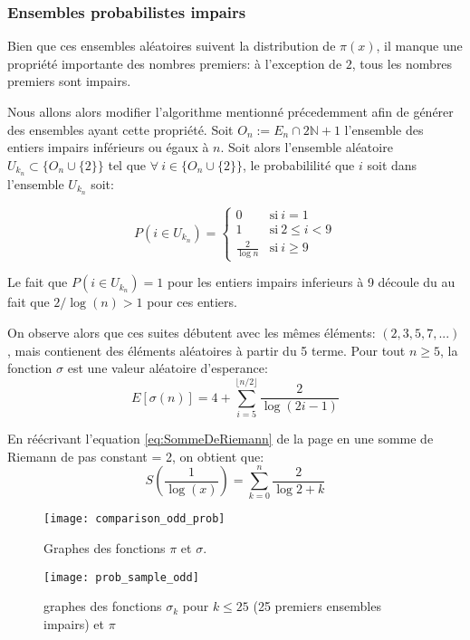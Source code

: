 \documentclass[../main.tex]{report}
\begin{document}
    \label{sec:odd_prob}
\subsubsection{Ensembles probabilistes impairs}
Bien que ces ensembles aléatoires suivent la distribution de $\pi(x)$, il manque une propriété importante des nombres premiers: à l'exception de $2$, tous les nombres premiers sont impairs.

Nous allons alors modifier l'algorithme mentionné précedemment afin de générer des ensembles ayant cette propriété. 
Soit $O_n := E_n \cap 2 \mathbb{N} +1$ l'ensemble des entiers impairs inférieurs ou égaux à $n$. 
Soit alors l'ensemble aléatoire 
$U_{k_n} \subset \{O_n \cup \{2\}\}$
tel que $\forall~i \in \{O_n \cup \{2\}\}$, le probabililité que $i$ soit dans l'ensemble $U_{k_n}$ soit:

\[
P(i \in U_{k_n}) = 
\left\{ 
    \begin{array}{cl}
         0 & \mbox{si}~i = 1 \\
         1 & \mbox{si}~ 2 \leq i < 9 \\
         \frac{2}{\log n} & \mbox{si}~i \geq 9
    \end{array}
\right.
\]

Le fait que $P(i \in U_{k_n}) = 1$ pour les entiers impairs inferieurs à 9 découle du au fait que $2/\log(n) > 1$ pour ces entiers.

On observe alors que ces suites débutent avec les mêmes éléments: $ (2,3,5,7,...) $, mais contienent des éléments aléatoires à partir du 5 terme. 
Pour tout $n \geq 5$, la fonction $\sigma$ est une valeur aléatoire d'esperance: 
\[
E[\sigma(n)] = 
4 + \sum_{i=5}^{\lfloor{n/2}\rfloor} \frac{2}{\log (2i-1)}
\]

En réécrivant l'equation \ref{eq:SommeDeRiemann} de la page \pageref{eq:SommeDeRiemann} en une somme de Riemann de pas constant = 2, on obtient que:
\[
S(\frac{1}{\log(x)}) = \sum_{k=0}^{n}\frac{2}{\log 2+k}
\]


\begin{figure}[H]
\centering
\texttt{[image: comparison\_odd\_prob]}
\caption{Graphes des fonctions $\pi$ et $\sigma$.}
\label{fig:comparison_sigma_prob}
\end{figure}

\begin{figure}[H]
	\centering
	\texttt{[image: prob\_sample\_odd]}
	\caption{graphes des fonctions $\sigma_k$ pour $k \leq 25$ (25 premiers ensembles impairs) et $\pi$}
	\label{fig:prob_sample_odd}
\end{figure}
\end{document}
